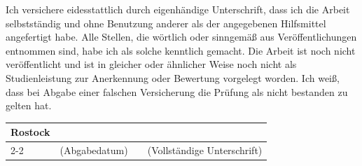 ﻿\documentclass{Vorlage}
\begin{document}
Ich versichere eidesstattlich durch eigenhändige Unterschrift, dass ich die Arbeit selbstständig und ohne Benutzung anderer als der angegebenen Hilfsmittel angefertigt habe. Alle Stellen, die wörtlich oder sinngemäß aus Veröffentlichungen entnommen sind, habe ich als solche kenntlich gemacht. Die Arbeit ist noch nicht veröffentlicht und ist in gleicher oder ähnlicher Weise noch nicht als Studienleistung zur Anerkennung oder Bewertung vorgelegt worden. Ich weiß, dass bei Abgabe einer falschen Versicherung die Prüfung als nicht bestanden zu gelten hat.

\vspace*{1cm}

\begin{table}[h]
\centering
\begin{tabular}{p{3cm} p{4cm} p{0.5cm} p{6cm}}
Rostock & & &\\[0.5cm]
\cline{2-2} \cline{4-4}
& (Abgabedatum) & & (Vollständige Unterschrift)\\
\end{tabular}
\end{table}
\end{document}
